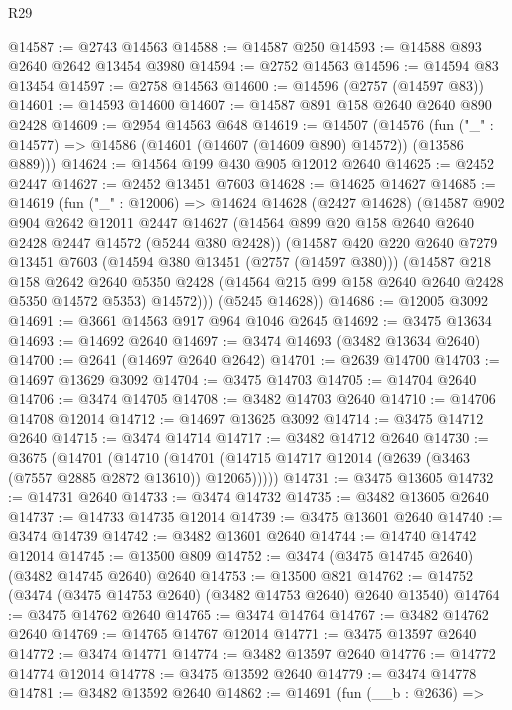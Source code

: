 \begin{lexlean}{R29}
\begin{coremodule}
@14587 := @2743 @14563
@14588 := @14587 @250
@14593 := @14588 @893 @2640 @2642 @13454 @3980
@14594 := @2752 @14563
@14596 := @14594 @83 @13454
@14597 := @2758 @14563
@14600 := @14596 (@2757 (@14597 @83))
@14601 := @14593 @14600
@14607 := @14587 @891 @158 @2640 @2640 @890 @2428
@14609 := @2954 @14563 @648
@14619 := @14507
    (@14576 (fun ("_" : @14577) => @14586 (@14601 (@14607 (@14609 @890) @14572)) (@13586 @889)))
@14624 := @14564 @199 @430 @905 @12012 @2640
@14625 := @2452 @2447
@14627 := @2452 @13451 @7603
@14628 := @14625 @14627
@14685 := @14619
    (fun ("_" : @12006) =>
    @14624
      @14628
      (@2427 @14628)
      (@14587
        @902
        @904
        @2642
        @12011
        @2447
        @14627
        (@14564 @899 @20 @158 @2640 @2640 @2428 @2447 @14572 (@5244 @380 @2428))
        (@14587
          @420
          @220
          @2640
          @7279
          @13451
          @7603
          (@14594 @380 @13451 (@2757 (@14597 @380)))
          (@14587
            @218
            @158
            @2642
            @2640
            @5350
            @2428
            (@14564 @215 @99 @158 @2640 @2640 @2428 @5350 @14572 @5353)
            @14572)))
      (@5245 @14628))
@14686 := @12005 @3092
@14691 := @3661 @14563 @917 @964 @1046 @2645
@14692 := @3475 @13634
@14693 := @14692 @2640
@14697 := @3474 @14693 (@3482 @13634 @2640)
@14700 := @2641 (@14697 @2640 @2642)
@14701 := @2639 @14700
@14703 := @14697 @13629 @3092
@14704 := @3475 @14703
@14705 := @14704 @2640
@14706 := @3474 @14705
@14708 := @3482 @14703 @2640
@14710 := @14706 @14708 @12014
@14712 := @14697 @13625 @3092
@14714 := @3475 @14712 @2640
@14715 := @3474 @14714
@14717 := @3482 @14712 @2640
@14730 := @3675
    (@14701
      (@14710 (@14701 (@14715 @14717 @12014 (@2639 (@3463 (@7557 @2885 @2872 @13610)) @12065)))))
@14731 := @3475 @13605
@14732 := @14731 @2640
@14733 := @3474 @14732
@14735 := @3482 @13605 @2640
@14737 := @14733 @14735 @12014
@14739 := @3475 @13601 @2640
@14740 := @3474 @14739
@14742 := @3482 @13601 @2640
@14744 := @14740 @14742 @12014
@14745 := @13500 @809
@14752 := @3474 (@3475 @14745 @2640) (@3482 @14745 @2640) @2640
@14753 := @13500 @821
@14762 := @14752 (@3474 (@3475 @14753 @2640) (@3482 @14753 @2640) @2640 @13540)
@14764 := @3475 @14762 @2640
@14765 := @3474 @14764
@14767 := @3482 @14762 @2640
@14769 := @14765 @14767 @12014
@14771 := @3475 @13597 @2640
@14772 := @3474 @14771
@14774 := @3482 @13597 @2640
@14776 := @14772 @14774 @12014
@14778 := @3475 @13592 @2640
@14779 := @3474 @14778
@14781 := @3482 @13592 @2640
@14862 := @14691
    (fun (__b : @2636) =>

\end{coremodule}
\end{lexlean}
